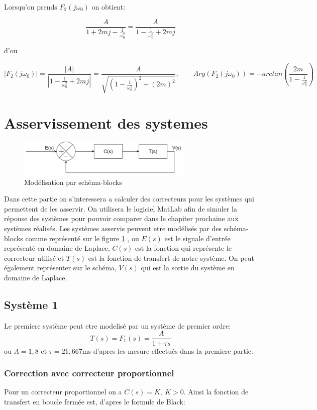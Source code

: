 \documentclass[12pt, a4paper]{report}
\begin{document}
Lorsqu'on prends $F_2(j\omega_0)$ on obtient:

\[
    \frac{A}{1 + 2mj - \frac{1}{\omega_0^2}} = \frac{A}{1 - \frac{1}{\omega_0^2} + 2mj}
\]

d'ou

\[
    |F_2(j\omega_0)| = \frac{|A|}{|1 - \frac{1}{\omega_0^2} + 2mj|} = \frac{A}{\sqrt{\left( 1 - \frac{1}{\omega_0^2} \right)^2 + \left( 2m \right) ^2}}, \quad   \quad Arg(F_2(j\omega_0)) = -arctan \left( \frac{2m}{1 - \frac{1}{\omega_0^2}}\right)
\]


\section{Asservissement des systemes}

\begin{figure}[h]
    \centering
    \includegraphics[width=0.75\textwidth]{schemablock2.png}
    \caption{Modélisation par schéma-blocks}
    \label{fig:schemablock}
\end{figure}

Dans cette partie on s'interessera a calculer des correcteurs
pour les systèmes qui permettent de les asservir. On utilisera le logiciel 
MatLab afin de simuler la réponse des systèmes pour pouvoir comparer dans le chapiter 
prochaine aux systèmes réalisés. Les systèmes asservis peuvent etre modélisés
par des schéma-blocks comme représenté sur le figure \ref{fig:schemablock}
, ou $E(s)$ est le signale
d'entrée représenté en domaine de Laplace, $C(s)$ est 
la fonction qui représente le correcteur utilisé et $T(s)$ est la fonction de transfert
de notre système. On peut également représenter sur le schéma, $V(s)$ qui est la sortie
du système en domaine de Laplace.
 



\subsection{Système 1}
Le premiere système peut etre modelisé par un système de premier ordre:
$$
    T(s) = F_1(s) = \frac{A}{1 + \tau s}
$$
ou $A = 1,8$ et $\tau = 21,667$ms d'apres les mesure effectués dans la premiere partie.

\subsubsection{Correction avec correcteur proportionnel}
Pour un correcteur proportionnel on a $C(s) = K, \ K > 0$. Ainsi la fonction de transfert 
en boucle fermée est, d'apres le formule de Black:
\end{document}

